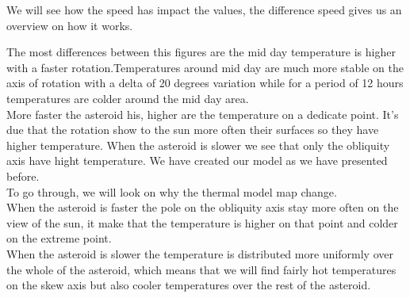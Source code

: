 We will see how the speed has impact the values, the difference speed gives us an overview on how it works.

The most differences between this figures are the mid day temperature is higher with a faster rotation.Temperatures around mid day are much more stable on the axis of rotation with a delta of 20 degrees variation while for a period of 12 hours temperatures are colder around the mid day area.\\[10pt]

More faster the asteroid his, higher are the temperature on a dedicate point. It's due that the rotation show to the sun more often their surfaces so they have higher temperature.
When the asteroid is slower we see that only the obliquity axis have hight temperature. We have created our model as we have presented before. \\[10pt]
To go through, we will look on why the thermal model map change.\\ [10pt]
When the asteroid is faster the pole on the obliquity axis stay more often on the view of the sun, it make that the temperature is higher on that point and colder on the extreme point.\\ [10pt]
When the asteroid is slower the temperature is distributed more uniformly over the whole of the asteroid, which means that we will find fairly hot temperatures on the skew axis but also cooler temperatures over the rest of the asteroid.\\[11pt]
